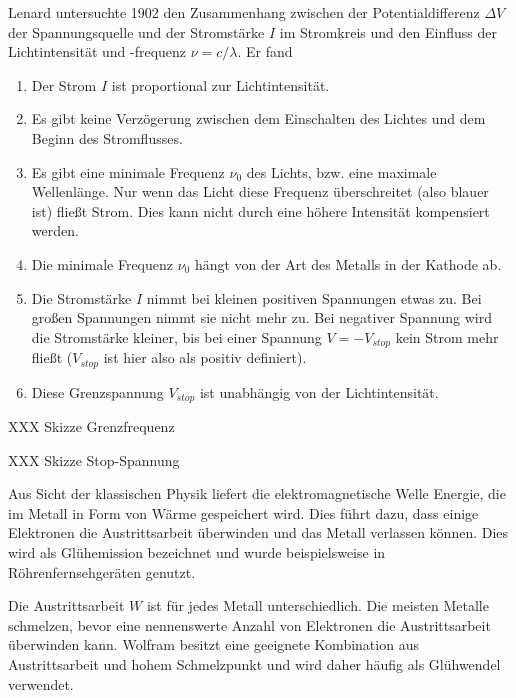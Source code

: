 Lenard untersuchte 1902 den Zusammenhang zwischen der Potentialdifferenz $\Delta V$ der Spannungsquelle und der Stromstärke $I$ im Stromkreis und den Einfluss der Lichtintensität und -frequenz $\nu = c / \lambda$. Er fand
\begin{enumerate}\setlength{\itemsep}{0pt}
    \item Der Strom $I$ ist proportional zur Lichtintensität.
    \item Es gibt keine Verzögerung zwischen dem Einschalten des Lichtes und dem Beginn des Stromflusses.
    \item Es gibt eine minimale Frequenz $\nu_0$ des Lichts, bzw. eine maximale Wellenlänge. Nur wenn das Licht diese Frequenz überschreitet (also blauer ist) fließt Strom. Dies kann nicht durch eine höhere Intensität kompensiert werden.
    \item Die minimale Frequenz $\nu_0$ hängt von der Art des Metalls in der Kathode ab.
    \item Die Stromstärke $I$ nimmt bei kleinen positiven Spannungen etwas zu. Bei großen Spannungen nimmt sie nicht mehr zu. Bei negativer Spannung wird die Stromstärke kleiner, bis bei einer Spannung $V = -V_{stop}$ kein Strom mehr fließt ($V_{stop}$ ist hier also als positiv definiert). 
    \item Diese Grenzspannung $V_{stop}$ ist unabhängig von der Lichtintensität. 
\end{enumerate}

\begin{marginfigure}
    \caption{XXX Skizze Grenzfrequenz}
   \end{marginfigure}

   \begin{marginfigure}
    \caption{XXX Skizze Stop-Spannung}
   \end{marginfigure}


Aus Sicht der klassischen Physik liefert die elektromagnetische Welle Energie, die im Metall in Form von Wärme gespeichert wird. Dies führt dazu, dass einige Elektronen die Austrittsarbeit überwinden und das Metall verlassen können. Dies wird als Glühemission bezeichnet und wurde beispielsweise in Röhrenfernsehgeräten genutzt.

Die Austrittsarbeit $W$ ist für jedes Metall unterschiedlich. Die meisten Metalle schmelzen, bevor eine nennenswerte Anzahl von Elektronen die Austrittsarbeit überwinden kann. Wolfram besitzt eine geeignete Kombination aus Austrittsarbeit und hohem Schmelzpunkt und wird daher häufig als Glühwendel verwendet.

